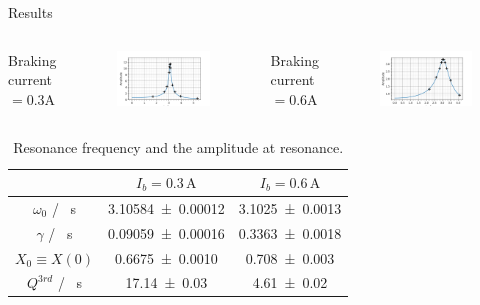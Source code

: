 \begin{frame}{Results}
\vspace{0.3cm}
\begin{columns}
\Large \centering Braking current $=0.3\si{\ampere}$
\begin{figure}[t]
	\includegraphics[width=0.95\linewidth]{images/result03.png}
\end{figure}
\Large \centering Braking current $=0.6\si{\ampere}$
\begin{figure}[t]
	\includegraphics[width=0.95\linewidth]{images/result06.png}
\end{figure}
\end{columns}
\pause
  \begin{table}[ht]
  	\centering
  	\begin{tabular}{c c c}
  		\toprule
  		& $I_b=0.3\, \si{\ampere}$ & $I_b=0.6 \, \si{\ampere} $\\
  		\midrule
  		$\omega_0$ / \si{\per\second} & \num{3.10584 \pm 0.00012} & \num{3.1025 \pm 0.0013} \\
  		$\gamma$ / \si{\per\second} & \num{0.09059 \pm 0.00016} & \num{0.3363 \pm 0.0018} \\
  		$X_0 \equiv X(0)$ & \num{0.6675 \pm 0.0010} & \num{0.708 \pm 0.003} \\
  		$Q^{3rd}$ / \si{\per\second} & \num{17.14 \pm 0.03} & \num{4.61 \pm 0.02} \\
  		\bottomrule
  	\end{tabular}
  	\caption{Resonance frequency and the amplitude at resonance.}
  	\label{table:resonance-infered-results}
  \end{table}
  
  
\end{frame}